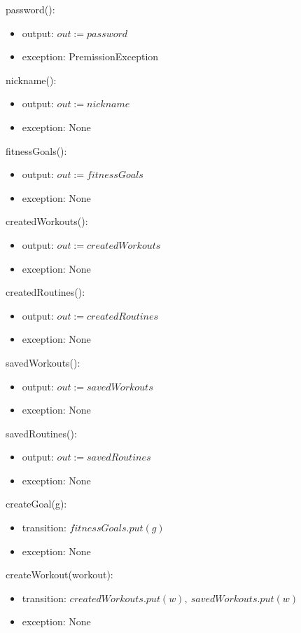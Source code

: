 \documentclass[12pt, titlepage]{article}
\begin{document}
password():
\begin{itemize}
	\item output: $out := password$
	\item exception: PremissionException
\end{itemize}

nickname():
\begin{itemize}
	\item output: $out := nickname$
	\item exception: None
\end{itemize}

fitnessGoals():
\begin{itemize}
	\item output: $out := fitnessGoals$
	\item exception: None
\end{itemize}

createdWorkouts():
\begin{itemize}
	\item output: $out := createdWorkouts$
	\item exception: None
\end{itemize}

createdRoutines():
\begin{itemize}
	\item output: $out := createdRoutines$
	\item exception: None
\end{itemize}

savedWorkouts():
\begin{itemize}
	\item output: $out := savedWorkouts$
	\item exception: None
\end{itemize}

savedRoutines():
\begin{itemize}
	\item output: $out := savedRoutines$
	\item exception: None
\end{itemize}

createGoal(g):
\begin{itemize}
	\item transition: $ fitnessGoals.put(g) $
	\item exception: None
\end{itemize}

createWorkout(workout):
\begin{itemize}
	\item transition: $ createdWorkouts.put(w), \ savedWorkouts.put(w) $
	\item exception: None
\end{itemize}
\end{document}
